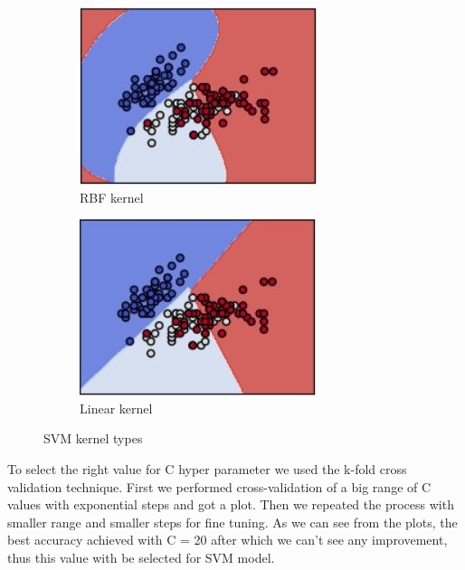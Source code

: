 \documentclass[12pt]{article}
\begin{document}
\begin{figure}[h]
\centering
\begin{subfigure}{.4\textwidth}
  \centering
  \includegraphics[width=.7\linewidth]{report_pics/SVM_RBF}
  \caption{RBF kernel}
  \label{fig:sub1}
\end{subfigure}%
\begin{subfigure}{.4\textwidth}
  \centering
  \includegraphics[width=.7\linewidth]{report_pics/SVM_linear}
  \caption{Linear kernel}
  \label{fig:sub2}
\end{subfigure}
\caption{SVM kernel types}
\label{fig:test}
\end{figure}

To select the right value for C hyper parameter we used the k-fold cross validation technique. First we performed cross-validation of a big range of C values with exponential steps and got a plot. Then we repeated the process with smaller range and smaller steps for fine tuning. As we can see from the plots, the best accuracy achieved with C = 20 after which we can't see any improvement, thus this value with be selected for SVM model.
\end{document}
